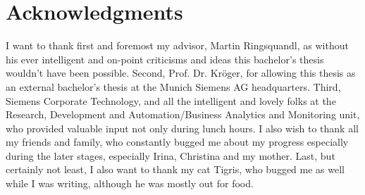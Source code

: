 \documentclass[pdftex,12pt,a4paper]{report}
\begin{document}
\chapter*{Acknowledgments}
I want to thank first and foremost my advisor, Martin Ringsquandl, as without his ever intelligent and on-point criticisms and ideas this bachelor's thesis wouldn't have been possible. Second, Prof. Dr. Kröger, for allowing this thesis as an external bachelor's thesis at the Munich Siemens AG headquarters. Third, Siemens Corporate Technology, and all the intelligent and lovely folks at the Research, Development and Automation/Business Analytics and Monitoring unit, who provided valuable input not only during lunch hours. I also wish to thank all my friends and family, who constantly bugged me about my progress especially during the later stages, especially Irina, Christina and my mother. Last, but certainly not least, I also want to thank my cat Tigris, who bugged me as well while I was writing, although he was mostly out for food.


\listoffigures
\listoftables
{}


\end{document}
